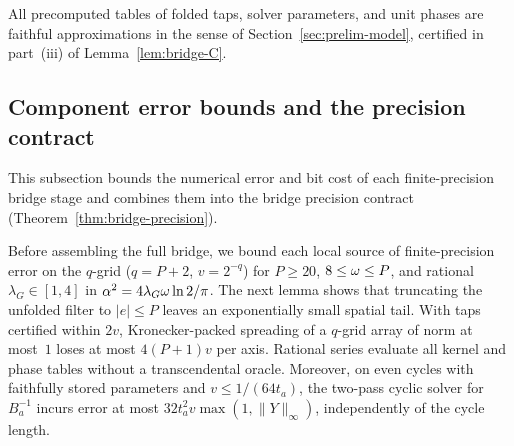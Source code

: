 All precomputed tables of folded taps, solver parameters, and unit phases are faithful approximations in the sense of
Section~\ref{sec:prelim-model}, certified in part~(iii) of Lemma~\ref{lem:bridge-C}.

\subsection{Component error bounds and the precision contract}\label{sec:bridge-C}\label{sec:bridge-thm}

This subsection bounds the numerical error and bit cost of each finite-precision bridge stage and combines them into the
bridge precision contract (Theorem~\ref{thm:bridge-precision}).

Before assembling the full bridge, we bound each local source of finite-precision error on the $q$-grid ($q=P+2$,
$v=2^{-q}$) for $P\ge 20$, $8\le\omega\le P$, and rational $\lambda_G\in[1,4]$ in $\alpha^2=4\lambda_G\omega\ln 2/\pi$. The
next lemma shows that truncating the unfolded filter to $|e|\le P$ leaves an exponentially small spatial tail. With taps
certified within $2v$, Kronecker-packed spreading of a $q$-grid array of norm at most~$1$ loses at most $4(P+1)v$ per
axis. Rational series evaluate all kernel and phase tables without a transcendental oracle. Moreover, on even cycles with
faithfully stored parameters and $v\le 1/(64t_a)$, the two-pass cyclic solver for $B_a^{-1}$ incurs error at most
$32t_a^2 v\max(1,\|Y\|_\infty)$, independently of the cycle length.


